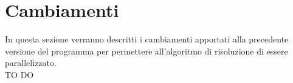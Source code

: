 % 
%
%

\section{Cambiamenti}
In questa sezione verranno descritti i cambiamenti apportati alla precedente versione del programma per permettere all'algoritmo di risoluzione di essere parallelizzato. \\
TO DO


